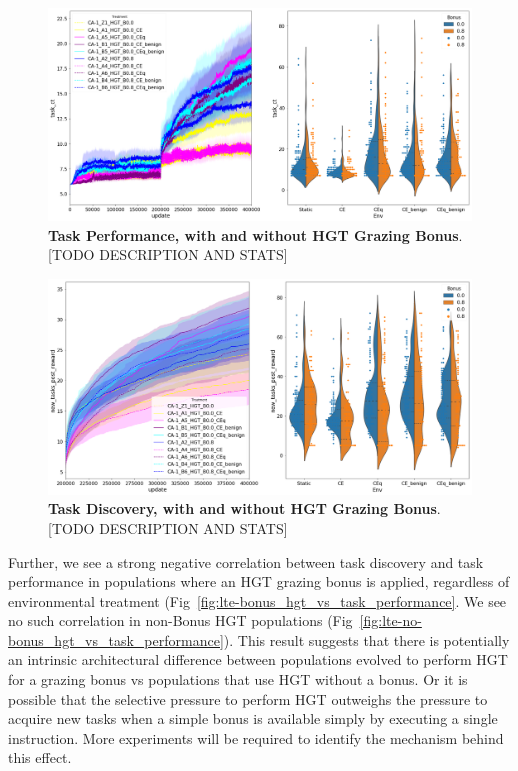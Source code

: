 \documentclass[PhD]{msu-thesis}
\begin{document}
	\begin{figure}[!h]
	\includegraphics[trim={0 0 0 0}, clip, width=0.75\columnwidth]{figures/LTE/lte-hgt-task_performance.png}
	\caption{\textbf{Task Performance, with and without HGT Grazing Bonus}. [TODO DESCRIPTION AND STATS]%
	}
	\label{fig:lte-hgt_task_performance}
	\end{figure}

	\begin{figure}[!h]
	\includegraphics[trim={0 0 0 0}, clip, width=0.75\columnwidth]{figures/LTE/lte-hgt-task_discovery.png}
	\caption{\textbf{Task Discovery, with and without HGT Grazing Bonus}. [TODO DESCRIPTION AND STATS]%
	}
	\label{fig:lte-hgt_task_discovery}
	\end{figure}

Further, we see a strong negative correlation between task discovery and task performance in populations where an HGT grazing bonus is applied, regardless of environmental treatment (Fig~\ref{fig:lte-bonus_hgt_vs_task_performance}. We see no such correlation in non-Bonus HGT populations (Fig~\ref{fig:lte-no-bonus_hgt_vs_task_performance}). This result suggests that there is potentially an intrinsic architectural difference between populations evolved to perform HGT for a grazing bonus vs populations that use HGT without a bonus. Or it is possible that the selective pressure to perform HGT outweighs the pressure to acquire new tasks when a simple bonus is available simply by executing a single instruction. More experiments will be required to identify the mechanism behind this effect.
\end{document}
